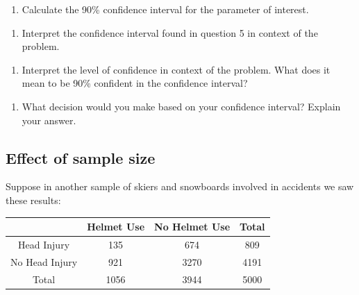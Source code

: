 \documentclass[
]{report}
\providecommand{\tightlist}{%
  \setlength{\itemsep}{0pt}\setlength{\parskip}{0pt}}
\begin{document}
\vspace{0.5in}

\begin{enumerate}
\def\labelenumi{\arabic{enumi}.}
\setcounter{enumi}{4}
\tightlist
\item
  Calculate the 90\% confidence interval for the parameter of interest.
\end{enumerate}

\vspace{0.8in}

\begin{enumerate}
\def\labelenumi{\arabic{enumi}.}
\setcounter{enumi}{5}
\tightlist
\item
  Interpret the confidence interval found in question 5 in context of the problem.
\end{enumerate}

\vspace{0.8in}

\begin{enumerate}
\def\labelenumi{\arabic{enumi}.}
\setcounter{enumi}{6}
\tightlist
\item
  Interpret the level of confidence in context of the problem. What does it mean to be 90\% confident in the confidence interval?
\end{enumerate}

\vspace{0.8in}

\begin{enumerate}
\def\labelenumi{\arabic{enumi}.}
\setcounter{enumi}{7}
\tightlist
\item
  What decision would you make based on your confidence interval? Explain your answer.
  \vspace{0.5in}
  \newpage
\end{enumerate}

\hypertarget{effect-of-sample-size-1}{%
\subsection{Effect of sample size}\label{effect-of-sample-size-1}}

Suppose in another sample of skiers and snowboards involved in accidents we saw these results:

\begin{longtable}[]{@{}cccc@{}}
\toprule()
& Helmet Use & No Helmet Use & Total \\
\midrule()
\endhead
Head Injury & 135 & 674 & 809 \\
No Head Injury & 921 & 3270 & 4191 \\
Total & 1056 & 3944 & 5000 \\
\bottomrule()
\end{longtable}
\end{document}
